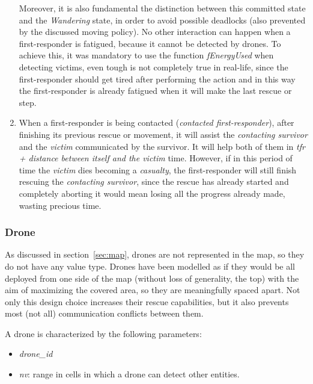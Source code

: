 \begin{enumerate}
	Moreover, it is also fundamental the distinction between this committed state and the \textit{Wandering} state, in order to avoid possible deadlocks (also prevented by the discussed moving policy).\newline
	No other interaction can happen when a first-responder is fatigued, because it cannot be detected by drones. To achieve this, it was mandatory to use the function \textit{fEnergyUsed} when detecting victims, even tough is not completely true in real-life, since the first-responder should get tired after performing the action and in this way the first-responder is already fatigued when it will make the last rescue or step.
	
	\item When a first-responder is being contacted (\textit{contacted first-responder}), after finishing its previous rescue or movement, it will assist the \textit{contacting survivor} and the \textit{victim} communicated by the survivor. It will help both of them in \textit{tfr + distance between itself and the victim} time. However, if in this period of time the \textit{victim} dies becoming a \textit{casualty}, the first-responder will still finish rescuing the \textit{contacting survivor}, since the rescue has already started and completely aborting it would mean losing all the progress already made, wasting precious time.
	
\end{enumerate}

\subsubsection{Drone}
\label{sec:drone}
As discussed in section~\ref{sec:map}, drones are not represented in the map, so they do not have any value type.\newline
Drones have been modelled as if they would be all deployed from one side of the map (without loss of generality, the top) with the aim of maximizing the covered area, so they are meaningfully spaced apart. Not only this design choice increases their rescue capabilities, but it also prevents most (not all) communication conflicts between them.\newline

\noindent
A drone is characterized by the following parameters:
\begin{itemize}
	\item \textit{drone\_id}
	\item \textit{nv}: range in cells in which a drone can detect other entities.
\end{itemize}


